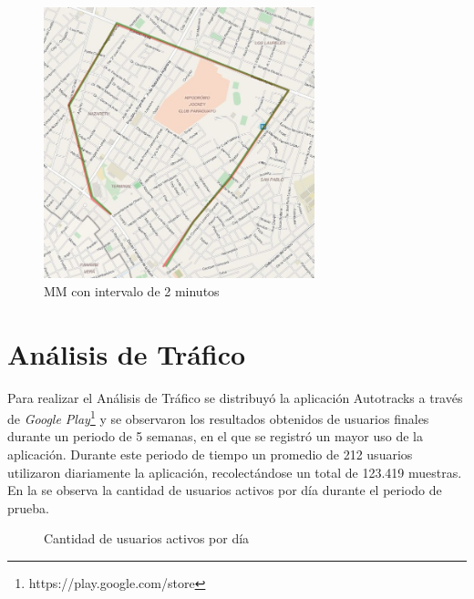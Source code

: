 \begin{figure}[!htb]
	\centering
	\includegraphics[width=0.7\textwidth]{capitulos/7/figuras/figura3.jpg}
	\caption{\label{fig:mm_2m} MM con intervalo de 2 minutos}	
\end{figure}

\section{Análisis de Tráfico}

Para realizar el Análisis de Tráfico se distribuyó la aplicación Autotracks a través de \emph{Google Play}\footnote{https://play.google.com/store} y se observaron los resultados obtenidos de usuarios finales durante un periodo de 5 semanas, en el que se registró un mayor uso de la aplicación. Durante este periodo de tiempo un promedio de 212 usuarios utilizaron diariamente la aplicación, recolectándose un total de 123.419 muestras. En la  se observa la cantidad de usuarios activos por día durante el periodo de prueba.

\begin{figure}[h]
	\centering
	\caption{Cantidad de usuarios activos por día}
	\label{fig:cantidad_usuarios}
\end{figure}

